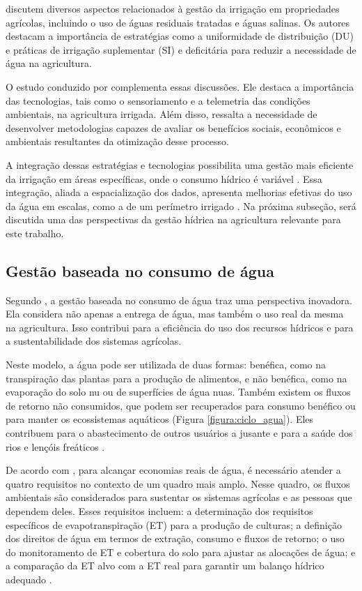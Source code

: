\textcite{Pereira_irrigation2002} discutem diversos aspectos relacionados à gestão da irrigação em propriedades agrícolas, incluindo o uso de águas residuais tratadas e águas salinas. Os autores destacam a importância de estratégias como a uniformidade de distribuição (DU) e práticas de irrigação suplementar (SI) e deficitária para reduzir a necessidade de água na agricultura.

O estudo conduzido por \textcite{Burton_irrigation2010} complementa essas discussões. Ele destaca a importância das tecnologias, tais como o sensoriamento e a telemetria das condições ambientais, na agricultura irrigada. Além disso, ressalta a necessidade de desenvolver metodologias capazes de avaliar os benefícios sociais, econômicos e ambientais resultantes da otimização desse processo.

A integração dessas estratégias e tecnologias possibilita uma gestão mais eficiente da irrigação em áreas específicas, onde o consumo hídrico é variável \parencite{carmody_fao2023}. Essa integração, aliada a espacialização dos dados, apresenta melhorias efetivas do uso da água em escalas, como a de um perímetro irrigado \parencite{Burton_irrigation2010, Ramos_irrigacao2022}. Na próxima subseção, será discutida uma das perspectivas da gestão hídrica na agricultura relevante para este trabalho.

\subsection{Gestão baseada no consumo de água}

Segundo \textcite{carmody_fao2023}, a gestão baseada no consumo de água traz uma perspectiva inovadora. Ela considera não apenas a entrega de água, mas também o uso real da mesma na agricultura. Isso contribui para a eficiência do uso dos recursos hídricos e para a sustentabilidade dos sistemas agrícolas. 

Neste modelo, a água pode ser utilizada de duas formas: benéfica, como na transpiração das plantas para a produção de alimentos, e não benéfica, como na evaporação do solo nu ou de superfícies de água nuas. Também existem os fluxos de retorno não consumidos, que podem ser recuperados para consumo benéfico ou para manter os ecossistemas aquáticos (Figura \ref{figura:ciclo_agua}). Eles contribuem para o abastecimento de outros usuários a jusante e para a saúde dos rios e lençóis freáticos \parencite{carmody_fao2023}.

De acordo com \textcite{carmody_fao2023}, para alcançar economias reais de água, é necessário atender a quatro requisitos no contexto de um quadro mais amplo. Nesse quadro, os fluxos ambientais são considerados para sustentar os sistemas agrícolas e as pessoas que dependem deles. Esses requisitos incluem: a determinação dos requisitos específicos de evapotranspiração (ET) para a produção de culturas; a definição dos direitos de água em termos de extração, consumo e fluxos de retorno; o uso do monitoramento de ET e cobertura do solo para ajustar as alocações de água; e a comparação da ET alvo com a ET real para garantir um balanço hídrico adequado \parencite{Allen_evapotranspiration1998, carmody_fao2023}.

